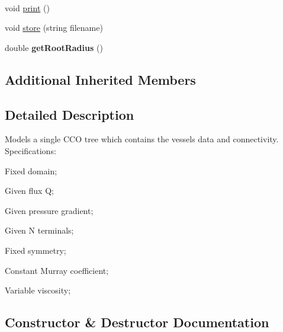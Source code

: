 \begin{DoxyCompactItemize}
$$\item 
void \mbox{\hyperlink{class_fixed_radius_root_variable_viscosity_c_c_o_tree_ace906f79ed34249637de23e3da9a6d7d}{print}} ()
\item 
void \mbox{\hyperlink{class_fixed_radius_root_variable_viscosity_c_c_o_tree_a344bd0496ff1c71c7f4289e598ad6760}{store}} (string filename)
\item 
\mbox{\label{class_fixed_radius_root_variable_viscosity_c_c_o_tree_a2d2312cce810822fe7372157a187cb59}} 
double {\bfseries get\+Root\+Radius} ()
\end{DoxyCompactItemize}
\subsection*{Additional Inherited Members}


\subsection{Detailed Description}
Models a single C\+CO tree which contains the vessel\textquotesingle{}s data and connectivity. Specifications\+:
\begin{DoxyItemize}
\item Fixed domain;
\item Given flux Q;
\item Given pressure gradient;
\item Given N terminals;
\item Fixed symmetry;
\item Constant Murray coefficient;
\item Variable viscosity; 
\end{DoxyItemize}

\subsection{Constructor \& Destructor Documentation}
\mbox{\label{class_fixed_radius_root_variable_viscosity_c_c_o_tree_a4c0d8b01e34db22d79faf4b4906e3c06}} 
